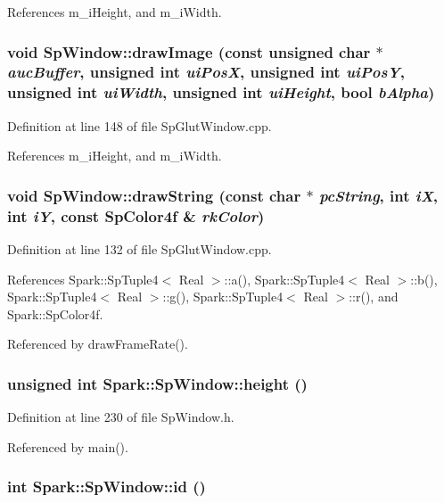 References m\_\-i\-Height, and m\_\-i\-Width.
\subsubsection{\setlength{\rightskip}{0pt plus 5cm}void Sp\-Window::draw\-Image (const unsigned char $\ast$ {\em auc\-Buffer}, unsigned int {\em ui\-Pos\-X}, unsigned int {\em ui\-Pos\-Y}, unsigned int {\em ui\-Width}, unsigned int {\em ui\-Height}, bool {\em b\-Alpha})}\label{classSpark_1_1SpWindow_a16}


Definition at line 148 of file Sp\-Glut\-Window.cpp.

References m\_\-i\-Height, and m\_\-i\-Width.
\subsubsection{\setlength{\rightskip}{0pt plus 5cm}void Sp\-Window::draw\-String (const char $\ast$ {\em pc\-String}, int {\em i\-X}, int {\em i\-Y}, const {\bf Sp\-Color4f} \& {\em rk\-Color})}\label{classSpark_1_1SpWindow_a18}


Definition at line 132 of file Sp\-Glut\-Window.cpp.

References Spark::Sp\-Tuple4$<$ Real $>$::a(), Spark::Sp\-Tuple4$<$ Real $>$::b(), Spark::Sp\-Tuple4$<$ Real $>$::g(), Spark::Sp\-Tuple4$<$ Real $>$::r(), and Spark::Sp\-Color4f.

Referenced by draw\-Frame\-Rate().
\subsubsection{\setlength{\rightskip}{0pt plus 5cm}unsigned int Spark::Sp\-Window::height ()\hspace{0.3cm}{\tt  [inline]}}\label{classSpark_1_1SpWindow_a28}


Definition at line 230 of file Sp\-Window.h.

Referenced by main().
\subsubsection{\setlength{\rightskip}{0pt plus 5cm}int Spark::Sp\-Window::id ()\hspace{0.3cm}{\tt  [inline]}}\label{classSpark_1_1SpWindow_a32}


